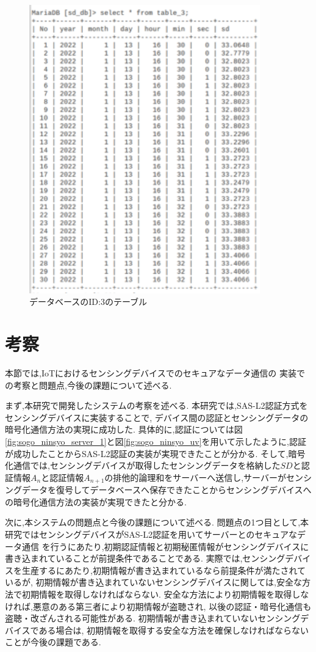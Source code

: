 \begin{figure}[H]
\begin{center}
	\includegraphics[width=10cm]{db_mcp.png}
	\caption{データベースのID:3のテーブル}
	\label{fig:db_mcp}
\end{center}
\end{figure}

\section{考察}
本節では,IoTにおけるセンシングデバイスでのセキュアなデータ通信の
実装での考察と問題点,今後の課題について述べる.

まず,本研究で開発したシステムの考察を述べる.
本研究では,SAS-L2認証方式をセンシングデバイスに実装することで,
デバイス間の認証とセンシングデータの暗号化通信方法の実現に成功した.
具体的に,認証については図\ref{fig:sogo_ninsyo_server_1}と図\ref{fig:sogo_ninsyo_uv}を用いて示したように,認証が成功したことからSAS-L2認証の実装が実現できたことが分かる.
そして,暗号化通信では,センシングデバイスが取得したセンシングデータを格納した$SD$と認証情報$A_n$と認証情報$A_{n+1}$の排他的論理和をサーバーへ送信し,サーバーがセンシングデータを復号してデータベースへ保存できたことからセンシングデバイスへの暗号化通信方法の実装が実現できたと分かる.

次に,本システムの問題点と今後の課題について述べる.
問題点の1つ目として,本研究ではセンシングデバイスがSAS-L2認証を用いてサーバーとのセキュアなデータ通信
を行うにあたり,初期認証情報と初期秘匿情報がセンシングデバイスに書き込まれていることが前提条件であることである.
実際では,センシングデバイスを生産するにあたり,初期情報が書き込まれているなら前提条件が満たされているが,
初期情報が書き込まれていないセンシングデバイスに関しては,安全な方法で初期情報を取得しなければならない.
安全な方法により初期情報を取得しなければ,悪意のある第三者により初期情報が盗聴され,
以後の認証・暗号化通信も盗聴・改ざんされる可能性がある.
初期情報が書き込まれていないセンシングデバイスである場合は,
初期情報を取得する安全な方法を確保しなければならないことが今後の課題である.


